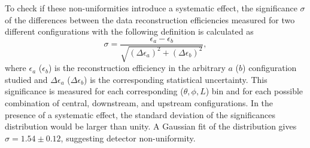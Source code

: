 \documentclass[a4paper,11pt]{article}
\begin{document}
To check if these non-uniformities introduce a systematic effect, the significance $\sigma$ of the differences between the data reconstruction efficiencies measured for two different configurations with the following definition is calculated as
\begin{equation}
\sigma = \frac{\epsilon_a-\epsilon_b}{\sqrt{(\Delta \epsilon_{a})^2 + (\Delta \epsilon_b)^2}},
\end{equation}
where $\epsilon_{a}$ ($\epsilon_{b}$) is the reconstruction efficiency in the arbitrary $a$ ($b$) configuration studied and $\Delta \epsilon_{a}$ ($\Delta \epsilon_{b}$) is the corresponding statistical uncertainty. This significance is measured for each corresponding ($\theta,\phi,L$) bin and for each possible combination of central, downstream, and upstream configurations. In the presence of a systematic effect, the standard deviation of the significances distribution would be larger than unity. A Gaussian fit of the distribution gives $\sigma = 1.54\pm0.12$, suggesting detector non-uniformity.


\end{document}
